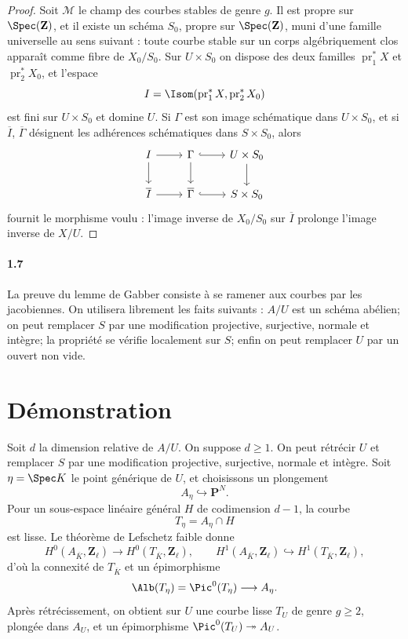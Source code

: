 \begin{proof}
Soit $\mathcal M$ le champ des courbes stables de genre $g$. Il est propre sur $\Spec(\mathbf Z)$, et il existe un schéma $S_0$, propre sur $\Spec(\mathbf Z)$, muni d'une famille universelle au sens suivant : toute courbe stable sur un corps algébriquement clos apparaît comme fibre de $X_0/S_0$. Sur $U\times S_0$ on dispose des deux familles $\operatorname{pr}_1^*X$ et $\operatorname{pr}_2^*X_0$, et l'espace
\[
  I=\Isom(\operatorname{pr}_1^*X,\operatorname{pr}_2^*X_0)
\]
est fini sur $U\times S_0$ et domine $U$. Si $\Gamma$ est son image schématique dans $U\times S_0$, et si $\overline I$, $\overline\Gamma$ désignent les adhérences schématiques dans $S\times S_0$, alors
\[
\begin{tikzcd}
I \arrow[r] \arrow[d] & \Gamma \arrow[r,hook] \arrow[d] & U\times S_0 \arrow[d]\\
\overline I \arrow[r] & \overline\Gamma \arrow[r,hook] & S\times S_0
\end{tikzcd}
\]
fournit le morphisme voulu : l'image inverse de $X_0/S_0$ sur $\overline I$ prolonge l'image inverse de $X/U$.
\end{proof}

\paragraph{1.7}
La preuve du lemme de Gabber consiste à se ramener aux courbes par les jacobiennes. On utilisera librement les faits suivants : $A/U$ est un schéma abélien; on peut remplacer $S$ par une modification projective, surjective, normale et intègre; la propriété se vérifie localement sur $S$; enfin on peut remplacer $U$ par un ouvert non vide.

\section{Démonstration}

Soit $d$ la dimension relative de $A/U$. On suppose $d\ge1$. On peut rétrécir $U$ et remplacer $S$ par une modification projective, surjective, normale et intègre. Soit $\eta=\Spec K$ le point générique de $U$, et choisissons un plongement
\[
  A_\eta\hookrightarrow \mathbf P^N.
\]
Pour un sous-espace linéaire général $H$ de codimension $d-1$, la courbe
\[
  T_\eta=A_\eta\cap H
\]
est lisse. Le théorème de Lefschetz faible donne
\[
  H^0(A_{\overline K},\mathbf Z_\ell)\to H^0(T_{\overline K},\mathbf Z_\ell),
  \qquad
  H^1(A_{\overline K},\mathbf Z_\ell)\hookrightarrow H^1(T_{\overline K},\mathbf Z_\ell),
\]
d'où la connexité de $T_{\overline K}$ et un épimorphisme
\[
  \Alb(T_\eta)=\Pic^0(T_\eta)\longrightarrow A_\eta .
\]
Après rétrécissement, on obtient sur $U$ une courbe lisse $T_U$ de genre $g\ge2$, plongée dans $A_U$, et un épimorphisme $\Pic^0(T_U)\twoheadrightarrow A_U$.

